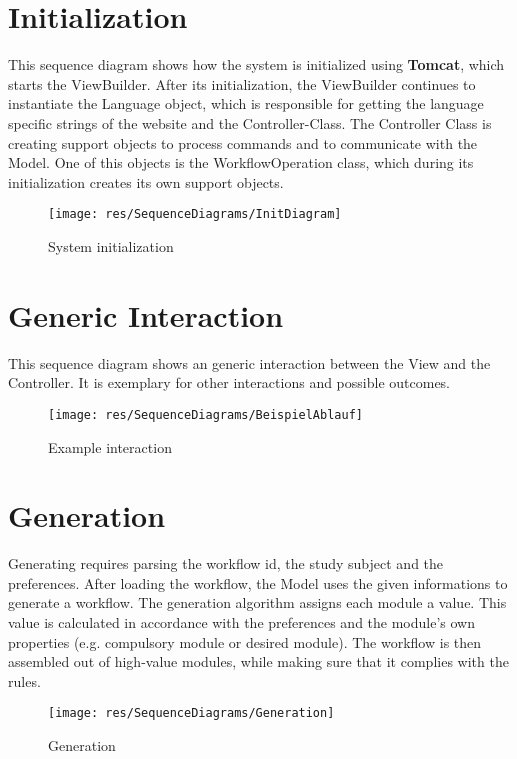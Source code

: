 \documentclass[11pt,a4paper]{report}
\begin{document}
{{{{{{{{{{{{{		\section{Initialization}{
			This sequence diagram shows how the system is initialized using \textbf{Tomcat}, which starts the ViewBuilder. After its initialization, the ViewBuilder continues to instantiate the Language object, which is responsible for getting the language specific strings of the website and the Controller-Class. The Controller Class is creating support objects to process commands and to communicate with the Model. One of this objects is the WorkflowOperation class, which during its initialization creates its own support objects.
		
			\begin{figure}[ht]
				\centering
				\texttt{[image: res/SequenceDiagrams/InitDiagram]}
				\caption{System initialization}
			\end{figure}
		}
		
		\clearpage
		
		\section{Generic Interaction}{
			This sequence diagram shows an generic interaction between the View and the Controller. It is exemplary for other interactions and possible outcomes.
			
			\begin{figure}[ht]
				\centering
				\texttt{[image: res/SequenceDiagrams/BeispielAblauf]}
				\caption{Example interaction}
			\end{figure}
		}
		
		\clearpage 
		
		\section{Generation}{
			Generating requires parsing the workflow id, the study subject and the preferences. After loading the workflow, the Model uses the given informations to generate a workflow. The generation algorithm assigns each module a value. This value is calculated in accordance with the preferences and the module's own properties (e.g. compulsory module or desired module). The workflow is then assembled out of high-value modules, while making sure that it complies with the rules. 
			\begin{figure}[ht]
				\centering
				\texttt{[image: res/SequenceDiagrams/Generation]}
				\caption{Generation}
			\end{figure}
		}
		
}}}}}}}}}}}}}
\end{document}
